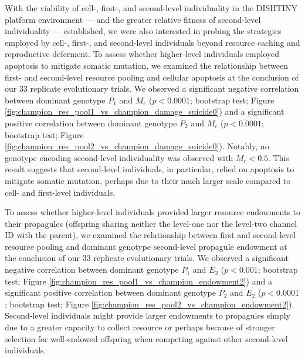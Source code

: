 With the viability of cell-, first-, and second-level individuality in the DISHTINY platform environment --- and the greater relative fitness of second-level individuality --- established, we were also interested in probing the strategies employed by cell-, first-, and second-level individuals beyond resource caching and reproductive deferment.
To assess whether higher-level individuals employed apoptosis to mitigate somatic mutation, we examined the relationship between first- and second-level resource pooling and cellular apoptosis at the conclusion of our 33 replicate evolutionary trials.
We observed a significant negative correlation between dominant genotype $P_1$ and $M_{c}$ ($p < 0.0001$; bootstrap test; Figure \ref{fig:champion_res_pool1_vs_champion_damage_suicide0}) and a significant positive correlation between dominant genotype $P_2$ and $M_{c}$ ($p < 0.0001$; bootstrap test; Figure \ref{fig:champion_res_pool2_vs_champion_damage_suicide0}).
Notably, no genotype encoding second-level individuality was observed with $M_{c} < 0.5$.
This result suggests that second-level individuals, in particular, relied on apoptosis to mitigate somatic mutation, perhaps due to their much larger scale compared to cell- and first-level individuals.

To assess whether higher-level individuals provided larger resource endowments to their propagules (offspring sharing neither the level-one nor the level-two channel ID with the parent), we examined the relationship between first and second-level resource pooling and dominant genotype second-level propagule endowment at the conclusion of our 33 replicate evolutionary trials.
We observed a significant negative correlation between dominant genotype $P_1$ and $E_2$ ($p < 0.001$; bootstrap test; Figure \ref{fig:champion_res_pool1_vs_champion_endowment2}) and a significant positive correlation between dominant genotype $P_2$ and $E_2$ ($p <  0.0001$; bootstrap test; Figure \ref{fig:champion_res_pool2_vs_champion_endowment2}).
Second-level individuals might provide larger endowments to propagules simply due to a greater capacity to collect resource or perhaps because of stronger selection for well-endowed offspring when competing against other second-level individuals.
